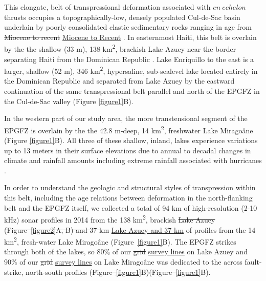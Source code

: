 \documentclass[linenumbers,draft]{agujournal}
\providecommand{\DIFdel}[1]{{\protect\color{red}\sout{#1}}}                      %
\providecommand{\DIFaddbegin}{} %
\providecommand{\DIFaddend}{} %
\providecommand{\DIFdelbegin}{} %
\providecommand{\DIFdelend}{} %
\begin{document}
This elongate, belt of transpressional deformation associated with $en~echelon$ thrusts occupies a topographically-low, densely populated Cul-de-Sac basin underlain by poorly consolidated clastic sedimentary rocks ranging in age from \DIFdelbegin \DIFdel{Miocene to recent }\DIFdelend \DIFaddbegin \ul{Miocene to Recent} \DIFaddend \citep{massoni1955haiti,mann1995actively,terrier2014revision,saint2015seismotectonics}. In easternmost Haiti, this belt is overlain by the the shallow (33 m), 138 km\textsuperscript{2}, brackish Lake Azuey near the border separating Haiti from the Dominican Republic \citep{wright2015factors,piasecki2016bathymetric}. Lake Enriquillo to the east is a larger, shallow (52 m), 346 km\textsuperscript{2}, hypersaline, sub-sealevel lake located entirely in the Dominican Republic and separated from Lake Azuey by the eastward continuation of the same transpressional belt parallel and north of the EPGFZ in the Cul-de-Sac valley \citep{mann1995actively} (Figure \ref{figure1}B). 

In the western part of our study area, the more transtensional segment of the EPGFZ is overlain by the the 42.8 m-deep, 14 km\textsuperscript{2}, freshwater Lake Mirago\^ane (Figure \ref{figure1}B). All three of these shallow, inland, lakes experience variations up to 13 meters in their surface elevations due to annual to decadal changes in climate and rainfall amounts including extreme rainfall associated with hurricanes \citep{wright2015factors,piasecki2016bathymetric,moknatian2017development,rico2017hydrodynamic}.  

In order to understand the geologic and structural styles of transpression within this belt, including the age relations between deformation in the north-flanking belt and the EPGFZ itself, we collected a total of 94 km of high-resolution (2-10 kHz) sonar profiles in 2014 from the 138 km\textsuperscript{2}, brackish \DIFdelbegin \DIFdel{Lake Azuey (Figure~\ref{figure2}A, B) and 37 km }\DIFdelend \DIFaddbegin \ul{Lake Azuey and 37 km} \DIFaddend of profiles from the 14 km\textsuperscript{2}, fresh-water Lake Mirago\^ane (Figure~\ref{figure1}B). The EPGFZ strikes through both of the lakes, so 80\% of our \DIFdelbegin \DIFdel{grid }\DIFdelend \DIFaddbegin \ul{survey lines} \DIFaddend on Lake Azuey and 90\% of our \DIFdelbegin \DIFdel{grid }\DIFdelend \DIFaddbegin \ul{survey lines} \DIFaddend on Lake Mirago\^ane was dedicated to the across fault-strike, north-south profiles \DIFdelbegin \DIFdel{(Figure~\ref{figure1}B)}\DIFdelend \DIFaddbegin \st{(Figure~{\ref{figure1}}B)}\DIFaddend . 
\end{document}
